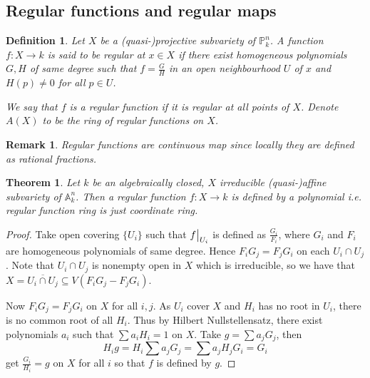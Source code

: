 \documentclass{ctexart}
\newtheorem{definition}{Definition}[section]
\newtheorem{remark}{Remark}[section]
\newtheorem{theorem}{Theorem}[section]
\begin{document}
\subsection{Regular functions and regular maps}
\label{subsection:Projective_Variety_Regular_functions_and_regular_maps}

\begin{definition}
    Let $X$ be a (quasi-)projective subvariety of $\mathbb{P}_{k}^{n}$.
    A function $f: X \rightarrow k$ is said to be regular at $x\in X$ if there exist homogeneous polynomials $G, H$ of same degree such that $f = \frac{G}{H}$ in an open neighbourhood $U$ of $x$ and $H(p) \neq 0$ for all $p\in U$.
    \par
    We say that $f$ is a regular function if it is regular at all points of $X$.
    Denote $A(X)$ to be the ring of regular functions on $X$.
\end{definition}
\begin{remark}
    Regular functions are continuous map since locally they are defined as rational fractions.
\end{remark}
\begin{theorem}
    Let $k$ be an algebraically closed, $X$ irreducible (quasi-)affine subvariety of $\mathbb{A}_{k}^{n}$.
    Then a regular function $f: X \rightarrow k$ is defined by a polynomial i.e. regular function ring is just coordinate ring.
    \label{Theorem 2.1} 
\end{theorem}
\begin{proof}
    Take open covering $\{U_{i}\}$ such that $f\big{|}_{U_{i}}$ is defined as $\frac{G_{i}}{F_{i}}$, 
    where $G_{i}$ and $F_{i}$ are homogeneous polynomials of same degree.
    Hence $F_{i}G_{j} = F_{j}G_{i}$ on each $U_{i} \cap U_{j}$.
    Note that $U_{i} \cap U_{j}$ is nonempty open in $X$ which is irreducible, so we have that $X = \overline{U_{i} \cap U_{j}} \subseteq V(F_{i}G_{j} - F_{j}G_{i})$.
    \par
    Now $F_{i}G_{j} = F_{j}G_{i}$ on $X$ for all $i,j$.
    As $U_{i}$ cover $X$ and $H_{i}$ has no root in $U_{i}$, there is no common root of all $H_{i}$.
    Thus by Hilbert Nullstellensatz, there exist polynomials $a_{i}$ such that $\sum a_{i}H_{i} = 1$ on $X$.
    Take $g = \sum a_{j}G_{j}$, then 
    \begin{equation}
        H_{i}g = H_{i}\sum a_{j}G_{j} = \sum a_{j}H_{j}G_{i} = G_{i}
    \end{equation}
    get $\frac{G_{i}}{H_{i}} = g$ on $X$ for all $i$ so that $f$ is defined by $g$.
\end{proof}
\end{document}
